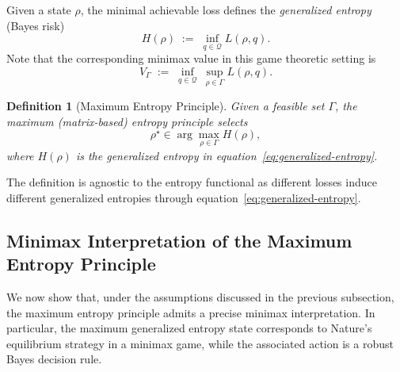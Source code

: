 \documentclass{article}
\newtheorem{definition}{Definition}
\theoremstyle{plain}
\theoremstyle{definition}
\def\eqref#1{equation~\ref{#1}}
\begin{document}
Given a state $\rho$, the minimal achievable loss defines the \emph{generalized
entropy} (Bayes risk)
\begin{equation}
H(\rho)
\;:=\;
\inf_{q \in \mathcal{Q}} L(\rho,q).
\label{eq:generalized-entropy}
\end{equation}
Note that the corresponding minimax value in this game theoretic setting is
\begin{equation}
V_\Gamma
\;:=\;
\inf_{q \in \mathcal{Q}} \ \sup_{\rho \in \Gamma} L(\rho,q).
\label{eq:minimax-value}
\end{equation}


\begin{definition}[Maximum Entropy Principle]
Given a feasible set $\Gamma$, the maximum (matrix-based) entropy principle selects
\begin{equation}
\rho^\star \in \arg\max_{\rho \in \Gamma} H(\rho),
\label{eq:maxent-def}
\end{equation}
where $H(\rho)$ is the generalized entropy in \eqref{eq:generalized-entropy}.
\end{definition}

\noindent
The definition is agnostic to the  entropy functional as different losses
induce different generalized entropies through \eqref{eq:generalized-entropy}.

\subsection{Minimax Interpretation of the Maximum Entropy Principle}
\label{subsec:minimax}

We now show that, under the assumptions discussed in the previous subsection, the maximum entropy principle
admits a precise minimax interpretation. In particular, the maximum generalized
entropy state corresponds to Nature's equilibrium strategy in a minimax game,
while the associated action is a robust Bayes decision rule.
\end{document}
